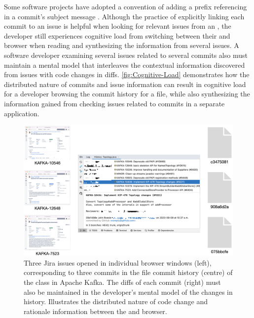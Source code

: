 Some software projects have adopted a convention of adding a prefix referencing 
 in a commit's subject message \cite{rastkar_why_2013,moreno_arena_2017}.
Although the practice of explicitly linking each commit to an issue is helpful when looking for relevant issues from an , the developer still experiences cognitive load from switching between their  and browser when reading and synthesizing the information from several issues.
A software developer examining several issues related to several commits also must maintain a mental model that interleaves the contextual information discovered from issues with code changes in diffs.
\autoref{fig:Cognitive-Load} demonstrates how the distributed nature of commits and issue information can result in cognitive load for a developer browsing the commit history for a file, while also synthesizing the information gained from checking issues related to commits in a separate application.

\begin{figure}
    \center
    \includegraphics[width=\textwidth]{./images/cognitive-load.png}
    \caption{
        Three Jira issues opened in individual browser windows (left), corresponding to three commits in the file commit history (centre) of the  class in Apache Kafka. 
        The diffs of each commit (right) must also be maintained in the developer's mental model of the changes in history. 
        Illustrates the distributed nature of code change and rationale information between the  and browser.
    }
    \label{fig:Cognitive-Load}
\end{figure}

